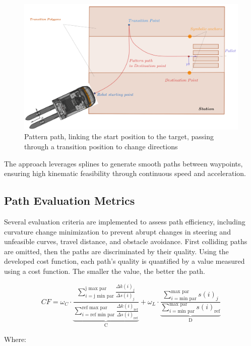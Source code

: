 \documentclass{amam}                %
\begin{document}
\begin{figure}[t]
  \centering \includegraphics[width=1.0\linewidth]{PatternPathComplFigure.png}
  \caption{Pattern path, linking the start position to the target, passing through a transition position to change directions \cite{ref2}}
  \label{pattern path}
\end{figure}

The approach leverages splines to generate smooth paths between waypoints, ensuring high kinematic feasibility through continuous speed and acceleration.
\subsection{Path Evaluation Metrics}
Several evaluation criteria are implemented to assess path efficiency, including curvature change minimization to prevent abrupt changes in steering and unfeasible curves, travel distance, and obstacle avoidance. First colliding paths are omitted, then the paths are discriminated by their quality. Using the developed cost function, each path's quality is quantified by a value measured using a cost function. The smaller the value, the better the path.

\begin{equation}
    CF= \omega_{C} \cdot \underbrace{\frac{\sum_{i=\text{j min par}}^{\text{j max par}} 
    \frac{\Delta k(i)_j}{\Delta s(i)_j}}{\sum_{i=\text{ref min par}}^{\text{ref max par}} 
    \frac{\Delta k(i)_{\text{ref}}}{\Delta s(i)_{\text{ref}}}}}_{\text{C}} 
    + \omega_{L} \cdot \underbrace{\frac{\sum_{i=\text{min par}}^{\text{max par}} s(i)_j}
    {\sum_{i=\text{min par}}^{\text{max par}} s(i)_{\text{ref}}}}_{\text{D}}
    \label{Norm_function}
\end{equation}

\noindent Where:
\end{document}
